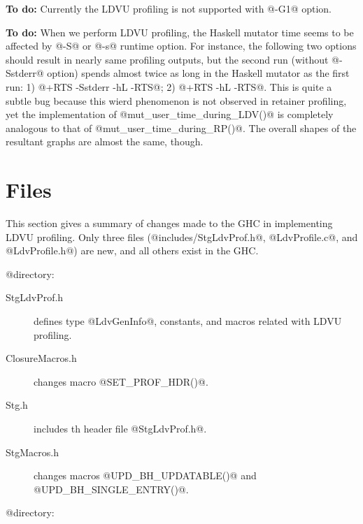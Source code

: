\documentclass{article}
\begin{document}
\textbf{To do:} Currently the LDVU profiling is not supported with @-G1@ option.

\textbf{To do:} When we perform LDVU profiling, the Haskell mutator time seems to
be affected by @-S@ or @-s@ runtime option. For instance, the following 
two options should result in nearly same profiling outputs, but
the second run (without @-Sstderr@ option) spends almost twice as
long in the Haskell mutator as the first run:
1) @+RTS -Sstderr -hL -RTS@; 2) @+RTS -hL -RTS@.
This is quite a subtle bug because this wierd phenomenon is not 
observed in retainer profiling, yet the implementation of 
@mut_user_time_during_LDV()@ is completely analogous to that of 
@mut_user_time_during_RP()@. The overall shapes of the resultant graphs 
are almost the same, though.

\section{Files}

This section gives a summary of changes made to the GHC in 
implementing LDVU profiling.
Only three files (@includes/StgLdvProf.h@, @LdvProfile.c@, and 
@LdvProfile.h@) are new, and all others exist in the GHC.

@ directory:

\begin{description}
\item[StgLdvProf.h] defines type @LdvGenInfo@, constants, and macros related
with LDVU profiling.
\item[ClosureMacros.h] changes macro @SET_PROF_HDR()@.
\item[Stg.h] includes th header file @StgLdvProf.h@.
\item[StgMacros.h] changes macros @UPD_BH_UPDATABLE()@ and @UPD_BH_SINGLE_ENTRY()@.
\end{description}

@\rts@ directory:
\end{document}
